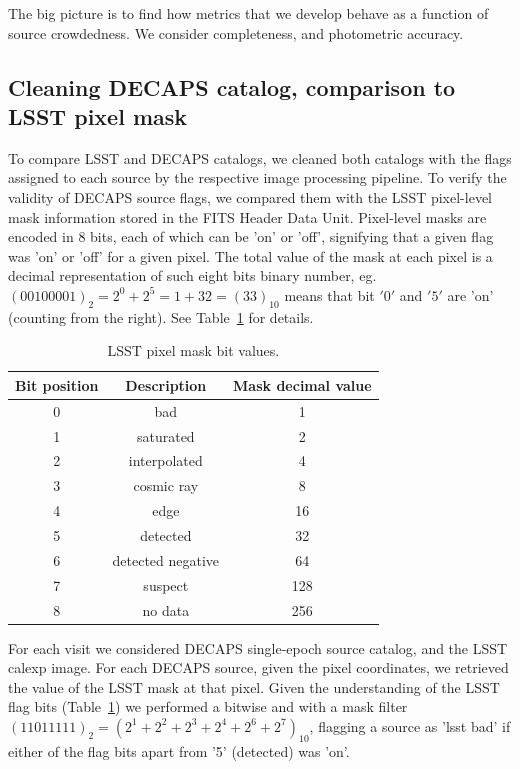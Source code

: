 \documentclass[DM,lsstdraft,toc,usenatbib]{lsstdoc}
\begin{document}
The big picture is to find how metrics that we develop behave as a function of source crowdedness. We consider completeness, and photometric accuracy. 

\subsection{Cleaning DECAPS catalog, comparison to LSST pixel mask}
\label{sec:clean_decaps}
To compare LSST and DECAPS catalogs, we cleaned both catalogs with the flags assigned to each source by the respective image processing pipeline. To verify the validity of DECAPS source flags, we compared them with the LSST pixel-level mask information stored in the FITS Header Data Unit. Pixel-level masks are encoded in 8 bits,  each of which can be 'on' or 'off', signifying that a given flag was 'on' or 'off' for a given pixel. The total value of the mask at each pixel is a decimal representation of such eight bits binary number, eg.  $(00100001)_{2} = 2^{0} + 2^{5}  = 1 + 32 = (33)_{10} $ means that bit $'0'$ and $'5'$ are 'on' (counting from the right). See Table~\ref{tab:lsst_flags} for details. 


\begin{table}
\centering
\caption{LSST pixel mask bit values.}
\label{tab:lsst_flags}
\begin{tabular}{ ccc} 
\hline
Bit position & Description & Mask decimal value  \\ 
\hline
0  & bad               & 1    \\ 
1  & saturated         & 2   \\ 
2  & interpolated      & 4    \\ 
3  & cosmic ray        & 8    \\ 
4  & edge              & 16    \\ 
5  & detected          & 32   \\ 
6  & detected negative & 64   \\ 
7  & suspect           & 128   \\ 
8  & no data           & 256     \\ 
\hline
\end{tabular}
\end{table}

For each  visit we considered DECAPS single-epoch source catalog, and the LSST calexp image.  For each DECAPS source, given the pixel coordinates, we retrieved the value of the LSST mask at that pixel. Given the understanding of the LSST flag bits (Table~\ref{tab:lsst_flags})  we performed a bitwise and with a mask filter$(11011111)_{2} = (2^{1}+2^{2}+2^{3}+2^{4}+2^{6}+2^{7})_{10}$, flagging a source as 'lsst bad' if either of the flag bits apart from '5' (detected) was 'on'. 
\end{document}
